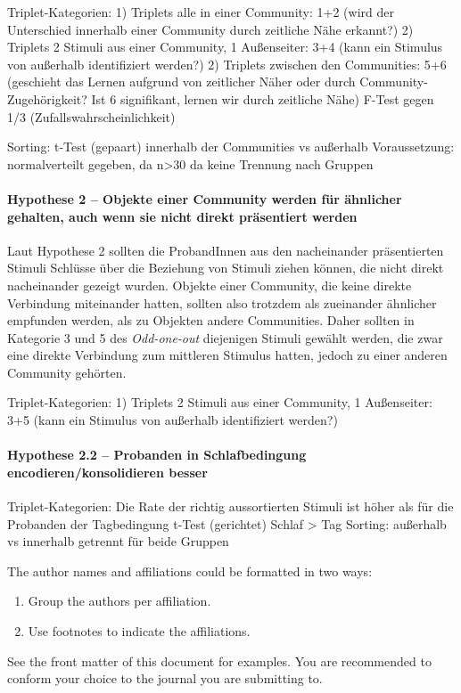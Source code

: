 \documentclass[preprint,12pt]{elsarticle}
\begin{document}
Triplet-Kategorien:
1) Triplets alle in einer Community: 1+2 (wird der Unterschied innerhalb einer Community durch zeitliche Nähe erkannt?)
2) Triplets 2 Stimuli aus einer Community, 1 Außenseiter: 3+4 (kann ein Stimulus von außerhalb identifiziert werden?)
2) Triplets zwischen den Communities: 5+6 (geschieht das Lernen aufgrund von zeitlicher Näher oder durch Community-Zugehörigkeit? Ist 6 signifikant, lernen wir durch zeitliche Nähe)
F-Test gegen 1/3 (Zufallswahrscheinlichkeit)

Sorting:
t-Test (gepaart) innerhalb der Communities vs außerhalb
Voraussetzung: normalverteilt gegeben, da n>30 da keine Trennung nach Gruppen

\paragraph{Hypothese 2 – Objekte einer Community werden für ähnlicher gehalten, auch wenn sie nicht direkt präsentiert werden}
Laut Hypothese 2 sollten die ProbandInnen aus den nacheinander präsentierten Stimuli Schlüsse über die Beziehung von Stimuli ziehen können, die nicht direkt nacheinander gezeigt wurden. Objekte einer Community, die keine direkte Verbindung miteinander hatten, sollten also trotzdem als zueinander ähnlicher empfunden werden, als zu Objekten andere Communities.
Daher sollten in Kategorie 3 und 5 des \textit{Odd-one-out} diejenigen Stimuli gewählt werden, die zwar eine direkte Verbindung zum mittleren Stimulus hatten, jedoch zu einer anderen Community gehörten.


Triplet-Kategorien:
1) Triplets 2 Stimuli aus einer Community, 1 Außenseiter: 3+5 (kann ein Stimulus von außerhalb identifiziert werden?)
\paragraph{Hypothese 2.2 – Probanden in Schlafbedingung encodieren/konsolidieren besser}
Triplet-Kategorien:
Die Rate der richtig aussortierten Stimuli ist höher als für die Probanden der Tagbedingung
t-Test (gerichtet) Schlaf > Tag
Sorting:
außerhalb vs innerhalb getrennt für beide Gruppen

The author names and affiliations could be formatted in two ways:
\begin{enumerate}[(1)]
\item Group the authors per affiliation.
\item Use footnotes to indicate the affiliations.
\end{enumerate}
See the front matter of this document for examples. You are recommended to conform your choice to the journal you are submitting to.
\end{document}
